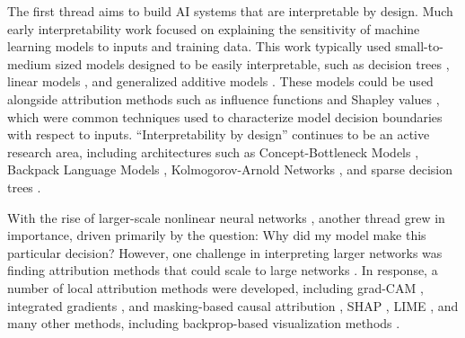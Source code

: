 The first thread aims to build AI systems that are interpretable by design. Much early interpretability work focused on explaining the sensitivity of machine learning models to inputs and training data. This work typically used small-to-medium sized models designed to be easily interpretable, such as decision trees \citep{Breiman_1984_Classification_Regression_Trees, Hu_2019_OptimalSparseDecisionTrees}, linear models \citep{Roweis_1999_LinearModel}, and generalized additive models \citep{Hastie_1986_AdditiveModel,Agarwal_2020_Additive_Model}. These models could be used alongside attribution methods such as influence functions \citep{Hampel_1986_Influence_Function,Koh_2017_influence_function} and Shapley values \citep{Shapley_1997_Shapley_Values, Lundberg_2017_SHAP}, which were common techniques used to characterize model decision boundaries with respect to inputs. “Interpretability by design” continues to be an active research area, including architectures such as Concept-Bottleneck Models \citep{Koh_2020_ConceptBottleneckModels}, Backpack Language Models \citep{Hewitt_2023_BackpackLanguageModels},
Kolmogorov-Arnold Networks \citep{Liu_2024_KolmogorovArtificialNetwork}, and sparse decision trees \citep{Xin_2022_SparseDecisionTrees}.

With the rise of larger-scale nonlinear neural networks \citep{Krizhevsky_2012_ImageNet, He_2015_ImageDNN}, another thread grew in importance, driven primarily by the question: Why did my model make this particular decision? However, one challenge in interpreting larger networks was finding attribution methods that could scale to large networks \citep{Zeiler_2013_VisualizingConvolutionalNetworks}. In response, a number of local attribution methods were developed, including grad-CAM \citep{Selvaraju_2019_GradCAM}, integrated gradients \citep{Sundarajan_2017_IntegratedGradients}, and masking-based causal attribution \citep{Fong_2017_MaskingBasedCausalAttribution}, SHAP \citep{Lundberg_2017_SHAP}, LIME \citep{Ribiero_2016_LIME}, and many other methods, including backprop-based visualization methods \citep{Simonyan_2014_BackpropVisualisation, Nguyen_2016_FeatureVisualization}.


